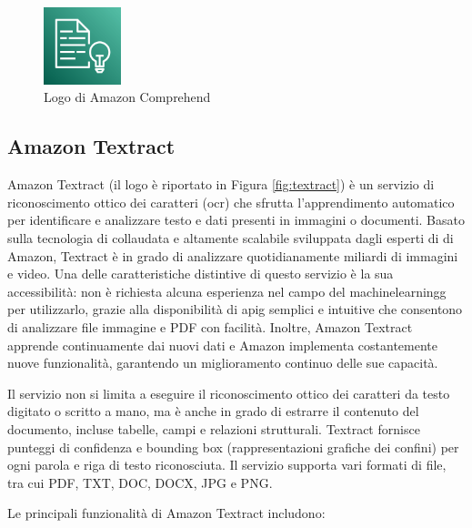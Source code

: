 \begin{figure}[h]
  \centering
  \includegraphics[width=0.2\textwidth]{img/tecnologie/comprehend.png}
  \caption{Logo di Amazon Comprehend}
  \label{fig:comprehend}
\end{figure}

\subsection{Amazon Textract}
Amazon Textract (il logo è riportato in Figura \ref{fig:textract}) è un servizio di riconoscimento ottico dei caratteri (\gls{ocr}) che sfrutta l'apprendimento automatico per identificare e analizzare testo e dati presenti in immagini o documenti. Basato sulla tecnologia di  collaudata e altamente scalabile sviluppata dagli esperti di  di Amazon, Textract è in grado di analizzare quotidianamente miliardi di immagini e video. Una delle caratteristiche distintive di questo servizio è la sua accessibilità: non è richiesta alcuna esperienza nel campo del \gls{machinelearningg} per utilizzarlo, grazie alla disponibilità di \gls{apig} semplici e intuitive che consentono di analizzare file immagine e PDF con facilità. Inoltre, Amazon Textract apprende continuamente dai nuovi dati e Amazon implementa costantemente nuove funzionalità, garantendo un miglioramento continuo delle sue capacità.

Il servizio non si limita a eseguire il riconoscimento ottico dei caratteri da testo digitato o scritto a mano, ma è anche in grado di estrarre il contenuto del documento, incluse tabelle, campi e relazioni strutturali. Textract fornisce punteggi di confidenza e bounding box (rappresentazioni grafiche dei confini) per ogni parola e riga di testo riconosciuta. Il servizio supporta vari formati di file, tra cui PDF, TXT, DOC, DOCX, JPG e PNG.

Le principali funzionalità di Amazon Textract includono:

